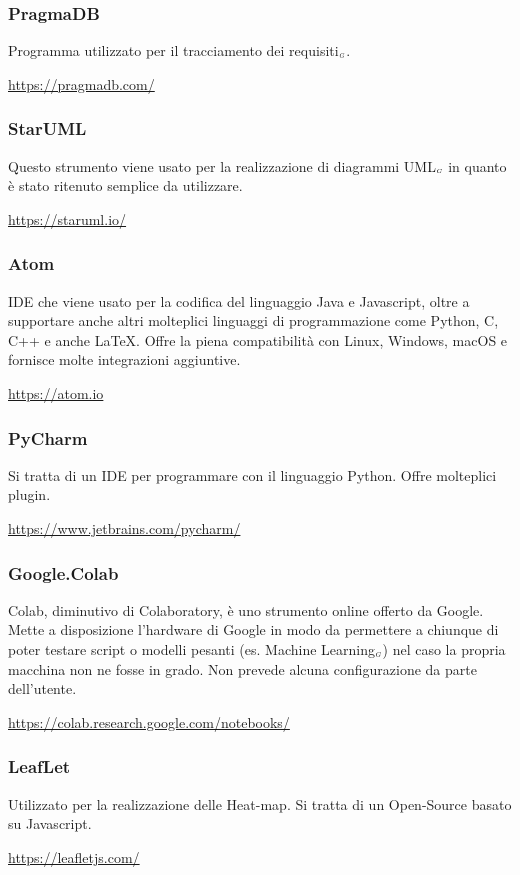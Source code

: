 \subsubsection{PragmaDB}\label{ProcessiPrimariStrumentiPragmaDB}
Programma utilizzato per il tracciamento dei requisiti$_{\scaleto{G}{3pt}}$.
\begin{center}
	\url{https://pragmadb.com/}
\end{center}
\subsubsection{StarUML}\label{ProcessiPrimariStrumentiDrawIo}
Questo strumento viene usato per la realizzazione di diagrammi UML$_{\scaleto{G}{3pt}}$ in quanto è stato ritenuto semplice da utilizzare.
\begin{center}
	\url{https://staruml.io/}
\end{center}
\subsubsection{Atom}\label{ProcessiPrimariStrumentiAtom}
IDE che viene usato per la codifica del linguaggio Java e Javascript, oltre a supportare anche altri molteplici linguaggi di programmazione come Python, C, C++ e anche \LaTeX. Offre la piena compatibilità con Linux, Windows, macOS e fornisce molte integrazioni aggiuntive.
\begin{center}
	\url{https://atom.io}
\end{center}
\subsubsection{PyCharm}\label{ProcessiPrimariStrumentiPyCharm}
Si tratta di un IDE per programmare con il linguaggio Python.
Offre molteplici plugin.
\begin{center}
	\url{https://www.jetbrains.com/pycharm/}
\end{center}
\subsubsection{Google.Colab}\label{ProcessiPrimariStrumentiGoogleColab}
Colab, diminutivo di Colaboratory, è uno strumento online offerto da Google.
Mette a disposizione l'hardware di Google in modo da permettere a chiunque di poter testare script o modelli pesanti (es. Machine Learning$_{\scaleto{G}{3pt}}$) nel caso la propria macchina non ne fosse in grado.
Non prevede alcuna configurazione da parte dell'utente.
\begin{center}
	\url{https://colab.research.google.com/notebooks/}
\end{center}
\subsubsection{LeafLet}\label{ProcessiPrimariStrumentiLeafLet}
Utilizzato per la realizzazione delle Heat-map.
Si tratta di un Open-Source basato su Javascript.
\begin{center}
	\url{https://leafletjs.com/}
\end{center}
